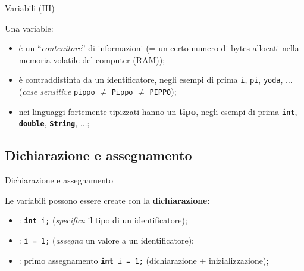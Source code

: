 \begin{frame}{Variabili (III)}

  Una variable:
  \begin{itemize}
    \item è un ``\emph{contenitore}'' di informazioni (= un certo numero di bytes allocati nella
	  memoria volatile del computer (RAM));
    \item è contraddistinta da un identificatore, negli esempi di prima \texttt{i}, \texttt{pi},
	  \texttt{yoda}, $\dots$
	  (\emph{case sensitive} \texttt{pippo} $\neq$ \texttt{Pippo} $\neq$ \texttt{PIPPO});
    \item nei linguaggi fortemente tipizzati hanno un \textbf{tipo}, negli esempi di prima
	  \texttt{\textbf{int}}, \texttt{\textbf{double}}, \texttt{\textbf{String}}, $\dots$;
  \end{itemize}

\end{frame}

\subsection[Dichiarazione e assegnamento]{Dichiarazione e assegnamento}

\begin{frame}{Dichiarazione e assegnamento}

  Le variabili possono essere create con la \textbf{dichiarazione}:
  \begin{itemize}
    \item \textbf{}: \texttt{\textbf{int} i;} (\emph{specifica} il tipo di un identificatore);
    \item \textbf{}:  \texttt{i = 1;} (\emph{assegna} un valore a un identificatore);
    \item \textbf{}: primo assegnamento \texttt{\textbf{int} i = 1;} (dichiarazione + inizializzazione);
  \end{itemize}

\end{frame}
